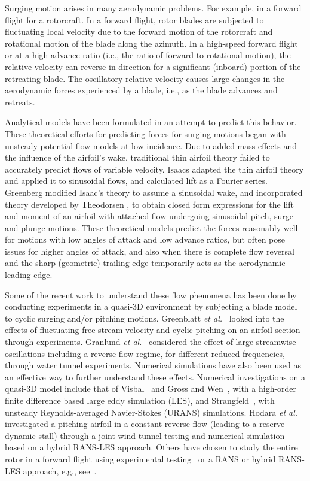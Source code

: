Surging motion arises in many aerodynamic problems.
For example, in a forward flight for a rotorcraft.
In a forward flight, rotor blades are subjected to fluctuating local velocity due to the forward motion of the rotorcraft 
and rotational motion of the blade along the azimuth. 
In a high-speed forward flight or at a high advance ratio (i.e., the ratio of forward to rotational motion), the relative velocity 
can reverse in direction for a significant (inboard) portion of the retreating blade.
The oscillatory relative velocity causes large changes in the aerodynamic forces experienced by a blade, i.e., as the blade advances and retreats. 

Analytical models have been formulated in an attempt to predict this behavior. These theoretical efforts for predicting forces for surging motions began with unsteady potential flow models at low incidence. 
Due to added mass effects and the influence of the airfoil’s wake, traditional thin airfoil theory failed to accurately predict flows of variable velocity. 
Isaacs \cite{bib:Isaacs} adapted the thin airfoil theory and applied it to sinusoidal flows, and calculated lift as a Fourier series.
Greenberg \cite{bib:Greenberg1947} modified Isaac's theory to assume a sinusoidal wake, and incorporated theory developed by Theodorsen \cite{bib:Theodorsen1934}, to obtain closed form expressions for the lift and moment of an airfoil with attached flow undergoing sinusoidal pitch, surge and plunge motions. 
These theoretical models predict the forces reasonably well \cite{bib:greenblatt2016} for motions with low angles of attack and low advance ratios, but often pose issues for higher angles of attack, and also when there is complete flow reversal and the sharp (geometric) trailing edge temporarily acts as the aerodynamic leading edge.

Some of the recent work to understand these flow phenomena has been done by conducting experiments in a quasi-3D environment by subjecting a blade model to cyclic surging and/or pitching motions.
Greenblatt \textit{et al.}~\cite{bib:greenblatt2016} looked into the effects of fluctuating free-stream velocity and cyclic pitching on an airfoil section through experiments.
Granlund \textit{et al.}~\cite{bib:granlund2016} considered the effect of large streamwise oscillations including a reverse flow regime, for different reduced frequencies, through water tunnel experiments.
Numerical simulations have also been used as an effective way to further understand these effects.
Numerical investigations on a quasi-3D model include that of Visbal~\cite{bib:visbal2014} and Gross and Wen~\cite{bib:gross2016}, with a high-order finite difference based large eddy simulation (LES), and Strangfeld~\cite{bib:stangfeld2015unsteady}, with unsteady Reynolds-averaged Navier-Stokes (URANS) simulations.
Hodara \textit{et al.}~\cite{bib:hodara2016} investigated a pitching airfoil in a constant reverse flow (leading to a reserve dynamic stall) through a joint wind tunnel testing and numerical simulation based on a hybrid RANS-LES approach.
Others have chosen to study the entire rotor in a forward flight using experimental testing~\cite{bib:norman2011} or a RANS or hybrid RANS-LES approach, e.g., see~\cite{bib:chaderjian2012detached,bib:potsdam2016}.

